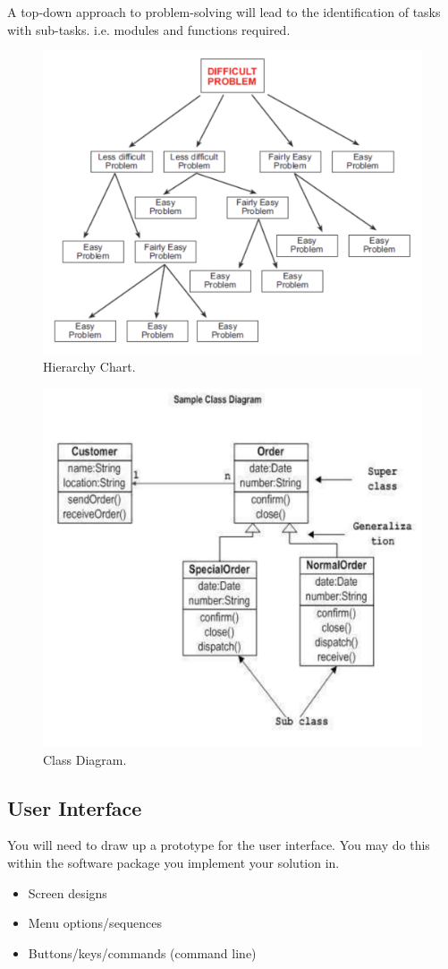 \documentclass[10pt]{article}
\begin{document}
A top-down approach to problem-solving will lead to the identification of tasks with sub-tasks. i.e. modules and functions required.

\begin{figure}[!ht]
    \centering
    \includegraphics[width = 0.5\linewidth]{hierarchy_chart.png}
    \caption{Hierarchy Chart.}
    \label{fig:hierarchy}
\end{figure}

\begin{figure}[!ht]
    \centering
    \includegraphics[width = 0.5\linewidth]{class_diagram.png}
    \caption{Class Diagram.}
    \label{fig:classes}
\end{figure}

\subsection{User Interface}
You will need to draw up a prototype for the user interface. You may do this within the software package you implement your solution in.
\begin{itemize}
    \item Screen designs
    \item Menu options/sequences
    \item Buttons/keys/commands (command line)
\end{itemize}
\end{document}
